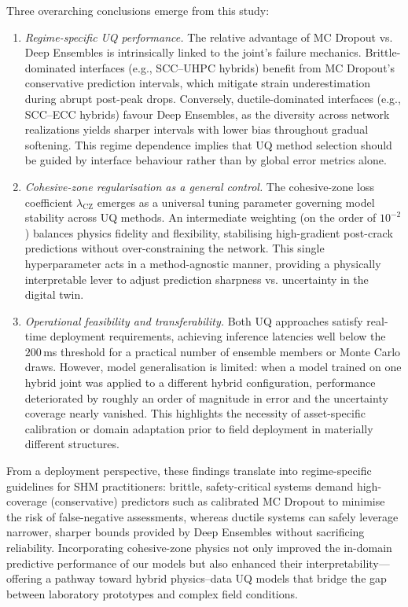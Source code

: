 \documentclass{article}
\begin{document}
Three overarching conclusions emerge from this study:

\begin{enumerate}
    \item \emph{Regime-specific UQ performance.} The relative advantage of MC Dropout vs. Deep Ensembles is intrinsically linked to the joint’s failure mechanics. Brittle-dominated interfaces (e.g., SCC--UHPC hybrids) benefit from MC Dropout’s conservative prediction intervals, which mitigate strain underestimation during abrupt post-peak drops. Conversely, ductile-dominated interfaces (e.g., SCC--ECC hybrids) favour Deep Ensembles, as the diversity across network realizations yields sharper intervals with lower bias throughout gradual softening. This regime dependence implies that UQ method selection should be guided by interface behaviour rather than by global error metrics alone.
    \item \emph{Cohesive-zone regularisation as a general control.} The cohesive-zone loss coefficient $\lambda_{\mathrm{CZ}}$ emerges as a universal tuning parameter governing model stability across UQ methods. An intermediate weighting (on the order of $10^{-2}$) balances physics fidelity and flexibility, stabilising high-gradient post-crack predictions without over-constraining the network. This single hyperparameter acts in a method-agnostic manner, providing a physically interpretable lever to adjust prediction sharpness vs. uncertainty in the digital twin.
    \item \emph{Operational feasibility and transferability.} Both UQ approaches satisfy real-time deployment requirements, achieving inference latencies well below the $200$\,ms threshold for a practical number of ensemble members or Monte Carlo draws. However, model generalisation is limited: when a model trained on one hybrid joint was applied to a different hybrid configuration, performance deteriorated by roughly an order of magnitude in error and the uncertainty coverage nearly vanished. This highlights the necessity of asset-specific calibration or domain adaptation prior to field deployment in materially different structures.
\end{enumerate}

From a deployment perspective, these findings translate into regime-specific guidelines for SHM practitioners: brittle, safety-critical systems demand high-coverage (conservative) predictors such as calibrated MC Dropout to minimise the risk of false-negative assessments, whereas ductile systems can safely leverage narrower, sharper bounds provided by Deep Ensembles without sacrificing reliability. Incorporating cohesive-zone physics not only improved the in-domain predictive performance of our models but also enhanced their interpretability—offering a pathway toward hybrid physics–data UQ models that bridge the gap between laboratory prototypes and complex field conditions.
\end{document}
